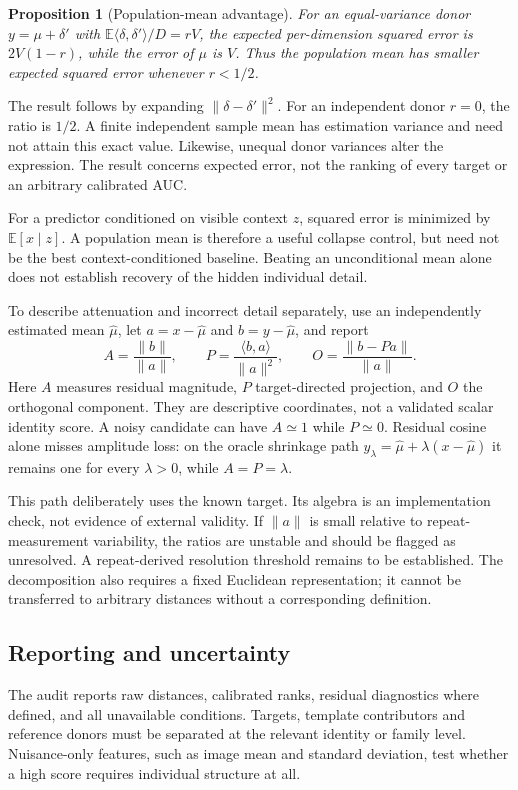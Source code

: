\documentclass[10pt,twocolumn,letterpaper]{article}
\newtheorem{proposition}{Proposition}
\newcommand{\E}{\mathbb{E}}
\begin{document}
\begin{proposition}[Population-mean advantage]
For an equal-variance donor $y=\mu+\delta'$ with $\E\langle\delta,\delta'\rangle/D=rV$, the expected per-dimension squared error is $2V(1-r)$, while the error of $\mu$ is $V$. Thus the population mean has smaller expected squared error whenever $r<1/2$.
\end{proposition}
\noindent The result follows by expanding $\|\delta-\delta'\|^2$. For an independent donor $r=0$, the ratio is $1/2$. A finite independent sample mean has estimation variance and need not attain this exact value. Likewise, unequal donor variances alter the expression. The result concerns expected error, not the ranking of every target or an arbitrary calibrated AUC.

For a predictor conditioned on visible context $z$, squared error is minimized by $\E[x\mid z]$. A population mean is therefore a useful collapse control, but need not be the best context-conditioned baseline. Beating an unconditional mean alone does not establish recovery of the hidden individual detail.

To describe attenuation and incorrect detail separately, use an independently estimated mean $\hat\mu$, let $a=x-\hat\mu$ and $b=y-\hat\mu$, and report
\begin{equation}
A=\frac{\|b\|}{\|a\|},\qquad
P=\frac{\langle b,a\rangle}{\|a\|^2},\qquad
O=\frac{\|b-Pa\|}{\|a\|}.
\label{eq:residuals}
\end{equation}
Here $A$ measures residual magnitude, $P$ target-directed projection, and $O$ the orthogonal component. They are descriptive coordinates, not a validated scalar identity score. A noisy candidate can have $A\simeq1$ while $P\simeq0$. Residual cosine alone misses amplitude loss: on the oracle shrinkage path $y_\lambda=\hat\mu+\lambda(x-\hat\mu)$ it remains one for every $\lambda>0$, while $A=P=\lambda$.

This path deliberately uses the known target. Its algebra is an implementation check, not evidence of external validity. If $\|a\|$ is small relative to repeat-measurement variability, the ratios are unstable and should be flagged as unresolved. A repeat-derived resolution threshold remains to be established. The decomposition also requires a fixed Euclidean representation; it cannot be transferred to arbitrary distances without a corresponding definition.

\subsection{Reporting and uncertainty}
The audit reports raw distances, calibrated ranks, residual diagnostics where defined, and all unavailable conditions. Targets, template contributors and reference donors must be separated at the relevant identity or family level. Nuisance-only features, such as image mean and standard deviation, test whether a high score requires individual structure at all.
\end{document}
